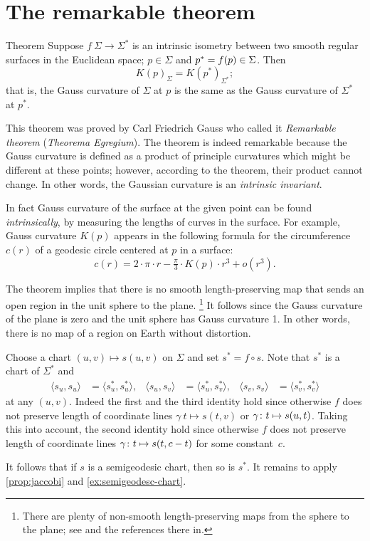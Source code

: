 \section{The remarkable theorem}


\begin{thm}{Theorem}\label{thm:remarkable}
Suppose $f\:\Sigma\to \Sigma^{*}$ is an intrinsic isometry between two smooth regular surfaces in  the Euclidean space; $p\in \Sigma$ and $p^{*}\z=f(p)\in \Sigma$.
Then 
\[K(p)_{\Sigma}=K(p^{*})_{\Sigma^{*}};\]
that is, the Gauss curvature of $\Sigma$ at $p$ is the same as the Gauss curvature of $\Sigma^{*}$ at $p^{*}$.
\end{thm}

This theorem was proved by Carl Friedrich Gauss \cite{gauss} who called it \emph{Remarkable theorem} (\emph{Theorema Egregium}).
The theorem is indeed remarkable because the Gauss curvature is defined as a product of principle curvatures which might be different at these points; however, according to the theorem, their product cannot change.
In other words, the Gaussian curvature is an {}\emph{intrinsic invariant}.

In fact Gauss curvature of the surface at the given point can be found {}\emph{intrinsically},
by measuring the lengths of curves in the surface.
For example, Gauss curvature $K(p)$ appears in the following formula for the circumference $c(r)$ of a geodesic circle centered at $p$ in a surface: 
\[c(r)=2\cdot\pi\cdot r-\tfrac\pi3\cdot K(p)\cdot r^3+o(r^3).\]

The theorem implies that there is no smooth length-preserving map that sends an open region in the unit sphere to the plane.%
\footnote{There are plenty of non-smooth length-preserving maps from the sphere to the plane; see \cite{petrunin-yashinski} and the references there in.}
It follows since the Gauss curvature of the plane is zero and the unit sphere has Gauss curvature 1. 
In other words, there is no map of a region on Earth without distortion.

 Choose a chart $(u,v)\mapsto s(u,v)$ on $\Sigma$ and set
$s^{*} =f\circ s$.
Note that $s^{*}$ is a chart of $\Sigma^{*}$ and 
\begin{align*}
\langle s_u,s_u\rangle
&=
\langle s_u^{*}, s_u^{*}\rangle,
&
\langle s_u, s_v\rangle
&=
\langle s_u^{*}, s_v^{*}\rangle,
&
\langle s_v, s_v\rangle
&=
\langle s_v^{*}, s_v^{*}\rangle
\end{align*}
at any $(u,v)$.
Indeed the first and the third identity hold since otherwise $f$ does not preserve length of coordinate lines $\gamma\:t\mapsto s(t,v)$ or  $\gamma\:t\z\mapsto s(u,t)$.
Taking this into account, the second identity hold since otherwise $f$ does not preserve length of coordinate lines $\gamma\:t\z\mapsto s(t,c-t)$ for some constant~$c$.

It follows that if $s$ is a semigeodesic chart,
then so is $s^{*}$.
It remains to apply \ref{prop:jaccobi} and \ref{ex:semigeodesc-chart}.
\qeds
